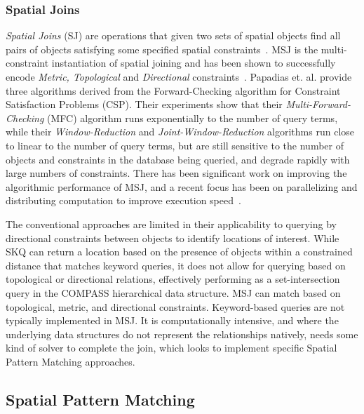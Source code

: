 \subsubsection{Spatial Joins}
\par{
    \textit{Spatial Joins} (SJ) are operations that given two sets of spatial objects find all pairs of objects satisfying some specified spatial constraints~\cite{Jacox2007}.
    MSJ is the multi-constraint instantiation of spatial joining and has been shown to successfully encode \textit{Metric, Topological} and \textit{Directional} constraints~\cite{Papadias1998}.
    Papadias et. al. provide three algorithms derived from the Forward-Checking algorithm for Constraint Satisfaction Problems (CSP). 
    Their experiments show that their \textit{Multi-Forward-Checking} (MFC) algorithm runs exponentially to the number of query terms, while their \textit{Window-Reduction} and \textit{Joint-Window-Reduction} algorithms run close to linear to the number of query terms, but are still sensitive to the number of objects and constraints in the database being queried, and degrade rapidly with large numbers of constraints.
    There has been significant work on improving the algorithmic performance of MSJ, and a recent focus has been on parallelizing and distributing computation to improve execution speed~\cite{Du2017}. 
}
\par{
    The conventional approaches are limited in their applicability to querying by directional constraints between objects to identify locations of interest.
    While SKQ can return a location based on the presence of objects within a constrained distance that matches keyword queries, it does not allow for querying based on topological or directional relations, effectively performing as a set-intersection query in the COMPASS hierarchical data structure.
    MSJ can match based on topological, metric, and directional constraints. 
    Keyword-based queries are not typically implemented in MSJ. 
    It is computationally intensive, and where the underlying data structures do not represent the relationships natively, needs some kind of solver to complete the join, which looks to implement specific Spatial Pattern Matching approaches. 
}

\subsection{Spatial Pattern Matching}

